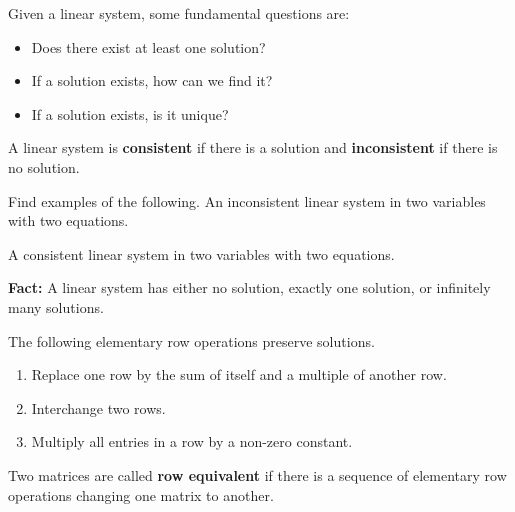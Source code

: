\begin{enumerate}
Given a linear system, some fundamental questions are:
\begin{itemize}
\item Does there exist at least one solution?
\item If a solution exists, how can we find it?
\item If a solution exists, is it unique?
\end{itemize}

\begin{defn}
A linear system is {\bf consistent} if there is a solution and {\bf inconsistent} if there is no solution.
\end{defn}

\Problem Find examples of the following.
\Part An inconsistent linear system in two variables with two equations.

\vfill

\Part A consistent linear system in two variables with two equations.

\vfill



\newpage

{\bf Fact:} A linear system has either no solution, exactly one solution, or infinitely many solutions.

\begin{defn}
The following elementary row operations preserve solutions.
\begin{enumerate}
\item Replace one row by the sum of itself and a multiple of another row.
\item Interchange two rows.
\item Multiply all entries in a row by a non-zero constant.
\end{enumerate}
\end{defn}

\begin{defn}
Two matrices are called {\bf row equivalent} if there is a sequence of elementary row operations changing one matrix to another.
\end{defn}


\end{enumerate}
